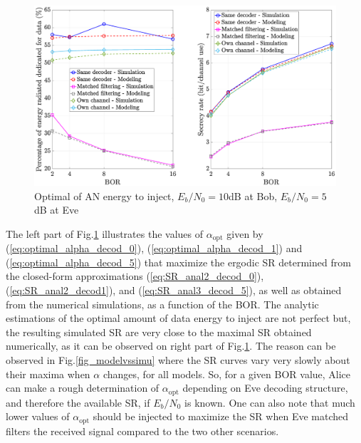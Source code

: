 \documentclass[journal,comsoc]{IEEEtran}
\let\MYoriglatexcaption\caption
\renewcommand{\caption}[2][\relax]{\MYoriglatexcaption[#2]{#2}}
\begin{document}
\begin{figure}[h!t]
	\centering
	\includegraphics[width=1.1\linewidth]{graphs/SISO_no_corr_optimal_alpha_EbN0b_10_EbN0e_5.eps}
	\caption{Optimal of AN energy to inject, $E_b/N_0 = 10$dB at Bob,  $E_b/N_0 = 5$dB at Eve}
	\label{fig_optimalAN}
\end{figure}
The left part of Fig.\ref{fig_optimalAN} illustrates the values of $\alpha_{\text{opt}}$ given by (\ref{eq:optimal_alpha_decod_0}), (\ref{eq:optimal_alpha_decod_1}) and (\ref{eq:optimal_alpha_decod_5}) that maximize the  ergodic SR determined from the closed-form approximations (\ref{eq:SR_anal2_decod_0}), (\ref{eq:SR_anal2_decod1}), and (\ref{eq:SR_anal3_decod_5}), as well as obtained from the numerical simulations, as a function of the BOR. The analytic estimations of the optimal amount of data energy to inject are not perfect but, the resulting simulated SR are very close to the maximal SR obtained numerically, as it can be observed on right part of Fig.\ref{fig_optimalAN}. The reason can be observed in Fig.\ref{fig_modelvssimu} where the SR curves vary very slowly about their maxima when $\alpha$ changes, for all models. So, for a given BOR value, Alice can make a rough determination of $\alpha_{\text{opt}}$ depending on Eve decoding structure, and therefore the available SR, if $E_b/N_0$ is known. One can also note that much lower values of $\alpha_{\text{opt}}$ should be injected to maximize the SR when Eve matched filters the received signal compared to the two other scenarios.
\end{document}
